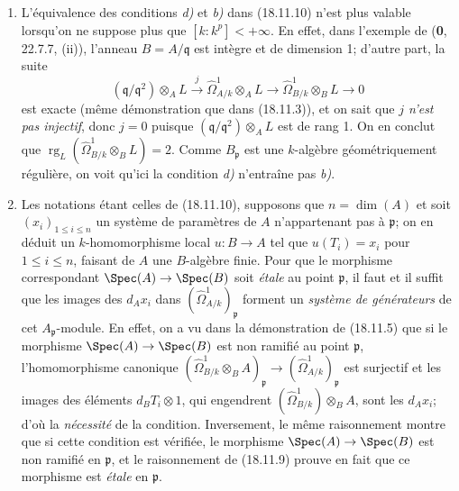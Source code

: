 \begin{remarks}[18.11.11]
\label{IV.18.11.11}
\begin{enumerate}
  \item[(i)] L'équivalence des conditions \emph{d)} et \emph{b)} dans (18.11.10) n'est plus valable lorsqu'on ne suppose plus que $[k:k^p]<+\infty$. En effet, dans l'exemple de (\textbf{0}, 22.7.7, (ii)), l'anneau $B=A/\mathfrak q$ est intègre et de dimension 1; d'autre part, la suite
  \[
    (\mathfrak q/\mathfrak q^2)\otimes_A L\xrightarrow{j}\hat{\Omega}^1_{A/k}\otimes_A L\longrightarrow\hat{\Omega}^1_{B/k}\otimes_B L\longrightarrow0
  \]
  est exacte (même démonstration que dans (18.11.3)), et on sait que \emph{$j$ n'est pas injectif}, donc $j=0$ puisque $(\mathfrak q/\mathfrak q^2)\otimes_A L$ est de rang 1. On en conclut que $\operatorname{rg}_L(\hat{\Omega}^1_{B/k}\otimes_B L)=2$. Comme $B_{\mathfrak p}$ est une $k$-algèbre géométriquement régulière, on voit qu'ici la condition \emph{d)} n'entraîne pas \emph{b)}.
  \item[(ii)] Les notations étant celles de (18.11.10), supposons que $n=\dim(A)$ et soit $(x_i)_{1\leq i\leq n}$ un système de paramètres de $A$ n'appartenant pas à $\mathfrak p$; on en déduit un $k$-homomorphisme local $u:B\to A$ tel que $u(T_i)=x_i$ pour $1\leq i\leq n$, faisant de $A$ une $B$-algèbre finie. Pour que le morphisme correspondant $\Spec(A)\to\Spec(B)$ soit \emph{étale} au point $\mathfrak p$, il faut et il suffit que les images des $d_Ax_i$ dans $(\hat{\Omega}^1_{A/k})_{\mathfrak p}$ forment un \emph{système de générateurs} de cet $A_{\mathfrak p}$-module. En effet, on a vu dans la démonstration de (18.11.5) que si le morphisme $\Spec(A)\to\Spec(B)$ est non ramifié au point $\mathfrak p$, l'homomorphisme canonique $(\hat{\Omega}^1_{B/k}\otimes_B A)_{\mathfrak p}\to(\hat{\Omega}^1_{A/k})_{\mathfrak p}$ est surjectif et les images des éléments $d_BT_i\otimes1$, qui engendrent $(\hat{\Omega}^1_{B/k})\otimes_B A$, sont les $d_Ax_i$; d'où la \emph{nécessité} de la condition. Inversement, le même raisonnement montre que si cette condition est vérifiée, le morphisme $\Spec(A)\to\Spec(B)$ est non ramifié en $\mathfrak p$, et le raisonnement de (18.11.9) prouve en fait que ce morphisme est \emph{étale} en $\mathfrak p$.
\end{enumerate}
\end{remarks}

